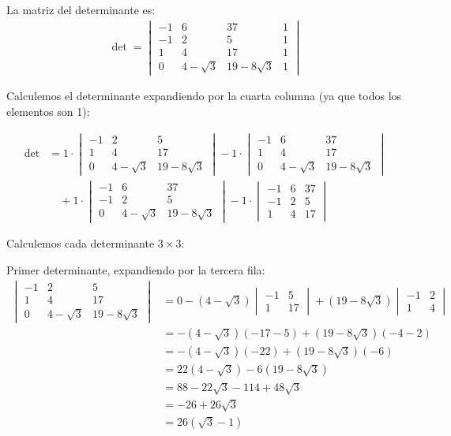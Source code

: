 \documentclass{article}
\begin{document}
La matriz del determinante es:
\begin{align}
\det = \begin{vmatrix}
-1 & 6 & 37 & 1 \\
-1 & 2 & 5 & 1 \\
1 & 4 & 17 & 1 \\
0 & 4-\sqrt{3} & 19-8\sqrt{3} & 1
\end{vmatrix}
\end{align}

Calculemos el determinante expandiendo por la cuarta columna (ya que todos los elementos son 1):

\begin{align}
\det &= 1 \cdot \begin{vmatrix}
-1 & 2 & 5 \\
1 & 4 & 17 \\
0 & 4-\sqrt{3} & 19-8\sqrt{3}
\end{vmatrix} - 1 \cdot \begin{vmatrix}
-1 & 6 & 37 \\
1 & 4 & 17 \\
0 & 4-\sqrt{3} & 19-8\sqrt{3}
\end{vmatrix} \\
&\quad + 1 \cdot \begin{vmatrix}
-1 & 6 & 37 \\
-1 & 2 & 5 \\
0 & 4-\sqrt{3} & 19-8\sqrt{3}
\end{vmatrix} - 1 \cdot \begin{vmatrix}
-1 & 6 & 37 \\
-1 & 2 & 5 \\
1 & 4 & 17
\end{vmatrix}
\end{align}

Calculemos cada determinante $3 \times 3$:

Primer determinante, expandiendo por la tercera fila:
\begin{align}
\begin{vmatrix}
-1 & 2 & 5 \\
1 & 4 & 17 \\
0 & 4-\sqrt{3} & 19-8\sqrt{3}
\end{vmatrix} &= 0 - (4-\sqrt{3}) \begin{vmatrix} -1 & 5 \\ 1 & 17 \end{vmatrix} + (19-8\sqrt{3}) \begin{vmatrix} -1 & 2 \\ 1 & 4 \end{vmatrix} \\
&= -(4-\sqrt{3})(-17-5) + (19-8\sqrt{3})(-4-2) \\
&= -(4-\sqrt{3})(-22) + (19-8\sqrt{3})(-6) \\
&= 22(4-\sqrt{3}) - 6(19-8\sqrt{3}) \\
&= 88 - 22\sqrt{3} - 114 + 48\sqrt{3} \\
&= -26 + 26\sqrt{3} \\
&= 26(\sqrt{3} - 1)
\end{align}
\end{document}
